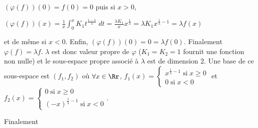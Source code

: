 {\begin{enumerate}
{ 
$(\varphi(f))(0)=f(0)=0$ puis si $x > 0$,

\begin{center}
$(\varphi(f))(x)=\frac{1}{x}\int_{0}^{x}K_1t^{\frac{1-\lambda}{\lambda}}\;dt=\frac{\lambda K_1}{x}x^{\frac{1}{\lambda}}=\lambda K_1 x^{\frac{1}{\lambda}-1}=\lambda f(x)$
\end{center}

et de même si $x < 0$. Enfin, $(\varphi(f))(0)=0=\lambda f(0)$. Finalement $\varphi(f) =\lambda f$. $\lambda$ est donc valeur propre de $\varphi$ ($K_1 = K_2 = 1$ fournit une fonction non nulle) et le sous-espace propre associé à $\lambda$ est de dimension $2$. Une base de ce sous-espace est $(f_1,f_2)$ où $\forall x\in\Rr$, $f_1(x)=\left\{
\begin{array}{l}
x^{\frac{1}{\lambda}-1}\;\text{si}\;x\geq0\\
0\;\text{si}\;x < 0
\end{array}
\right.$ et $f_2(x) =\left\{
\begin{array}{l}
0\;\text{si}\;x\geq0\\
(-x)^{\frac{1}{\lambda}-1}\;\text{si}\;x < 0
\end{array}
\right.$.

Finalement

\begin{center}
\shadowbox{
$\text{Sp}(\varphi)= ]0,1]$.
}
\end{center}}
\end{enumerate}
}
